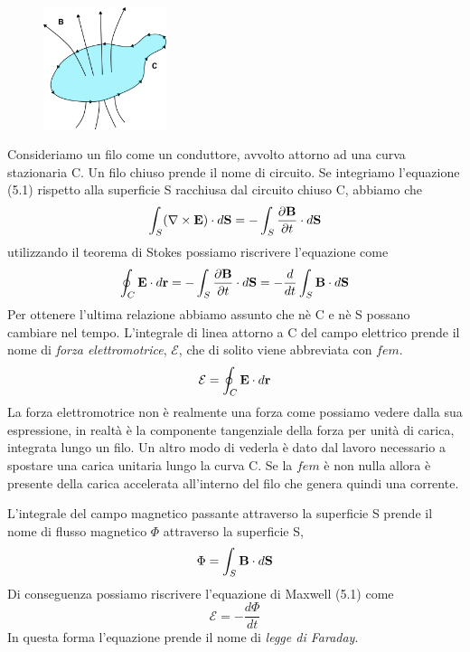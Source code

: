 \begin{figure} %
    \centering
    \includegraphics[width=0.32\textwidth]{images/faraday_law}
\end{figure}
Consideriamo un filo come un conduttore, avvolto attorno ad una curva stazionaria C. Un filo chiuso prende il nome di circuito. Se integriamo l'equazione (5.1) rispetto alla superficie S racchiusa dal circuito chiuso C, abbiamo che
\begin{equation*}
	\int_{S}(\nabla \times \bold{E}) \cdot d \bold{S} = - \int_{S} \frac{\partial \bold{B}}{\partial t} \cdot d\bold{S}
\end{equation*}
utilizzando il teorema di Stokes possiamo riscrivere l'equazione come
\begin{equation*}
	\oint_{C} \bold{E} \cdot d\bold{r} = - \int_{S} \frac{\partial \bold{B}}{\partial t} \cdot d \bold{S} = - \frac{d}{dt} \int_{S} \bold{B} \cdot d \bold{S}
\end{equation*}
Per ottenere l'ultima relazione abbiamo assunto che n\`e C e n\`e S possano cambiare nel tempo. L'integrale di linea attorno a C del campo elettrico prende il nome di \textit{forza elettromotrice}, $\mathcal{E}$, che di solito viene abbreviata con $fem$.
\begin{equation*}
	\mathcal{E} = \oint_{C} \bold{E} \cdot d \bold{r}
\end{equation*}
La forza elettromotrice non \`e realmente una forza come possiamo vedere dalla sua espressione, in realt\`a \`e la componente tangenziale della forza per unit\`a di carica, integrata lungo un filo. Un altro modo di vederla \`e dato dal lavoro necessario a spostare una carica unitaria lungo la curva C. Se la $fem$ \`e non nulla allora \`e presente della carica accelerata all'interno del filo che genera quindi una corrente.

L'integrale del campo magnetico passante attraverso la superficie S prende il nome di flusso magnetico $\Phi$ attraverso la superficie S,
\begin{equation*}
	\Phi = \int_{S} \bold{B} \cdot d\bold{S}
\end{equation*} 
Di conseguenza possiamo riscrivere l'equazione di Maxwell (5.1) come 
\begin{equation}
	\mathcal{E} = - \frac{d\Phi}{dt}
\end{equation}
In questa forma l'equazione prende il nome di \textit{legge di Faraday}. 
\newline

